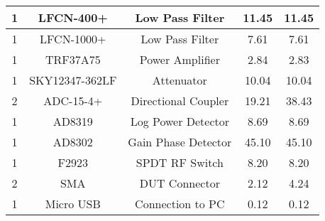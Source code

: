 \begin{table}[H]
\begin{tabular}{|c|c|c|c|c|}
		1                 & LFCN-400+                  & Low Pass Filter          & 11.45                                                                 & 11.45                                                                     \\ \hline
		1                 & LFCN-1000+                 & Low Pass Filter          & 7.61                                                                  & 7.61                                                                      \\ \hline
		1                 & TRF37A75                   & Power Amplifier          & 2.84                                                                  & 2.83                                                                      \\ \hline
		1                 & SKY12347-362LF             & Attenuator  & 10.04                                                                 & 10.04                                                                     \\ \hline
		2                 & ADC-15-4+                  & Directional Coupler      & 19.21                                                                 & 38.43                                                                     \\ \hline
		1                 & AD8319                     & Log Power Detector       & 8.69                                                                   & 8.69                                                                       \\ \hline
		1                 & AD8302                     & Gain Phase Detector      & 45.10                                                                   & 45.10                                                                       \\ \hline
		1                 & F2923                      & SPDT RF Switch           & 8.20                                                                  & 8.20                                                                      \\ \hline
		2                 & SMA                        & DUT Connector            & 2.12                                                                  & 4.24                                                                      \\ \hline
		1                 & Micro USB                  & Connection to PC         & 0.12                                                                  & 0.12                                                                      \\ \hline

\end{tabular}
\end{table}
